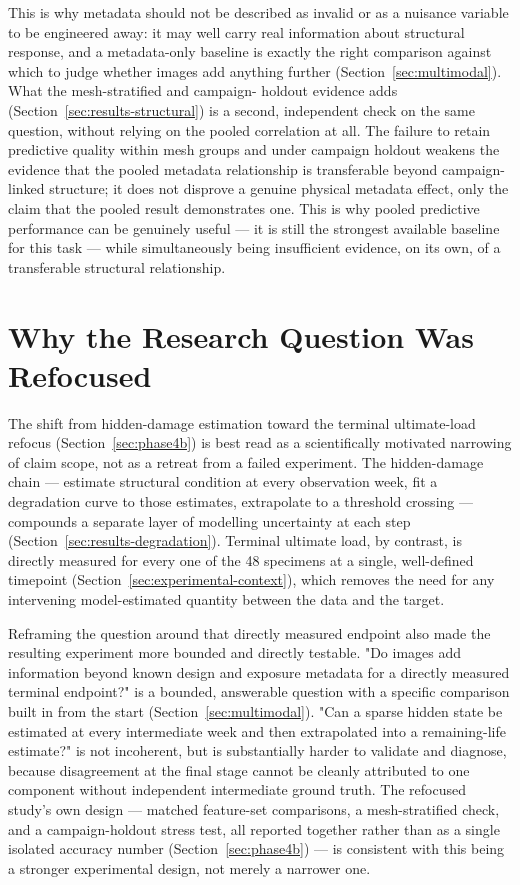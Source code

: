 This is why metadata should not be described as invalid or as a nuisance
variable to be engineered away: it may well carry real information about
structural response, and a metadata-only baseline is exactly the right
comparison against which to judge whether images add anything further
(Section~\ref{sec:multimodal}). What the mesh-stratified and campaign-
holdout evidence adds (Section~\ref{sec:results-structural}) is a second,
independent check on the same question, without relying on the pooled
correlation at all. The failure to retain predictive quality within mesh
groups and under campaign holdout weakens the evidence that the pooled
metadata relationship is transferable beyond campaign-linked structure; it
does not disprove a genuine physical metadata effect, only the claim that
the pooled result demonstrates one. This is why pooled predictive
performance can be genuinely useful — it is still the strongest available
baseline for this task — while simultaneously being insufficient evidence,
on its own, of a transferable structural relationship.

\section{Why the Research Question Was Refocused}
\label{sec:interp-refocus}

The shift from hidden-damage estimation toward the terminal ultimate-load
refocus (Section~\ref{sec:phase4b}) is best read as a scientifically
motivated narrowing of claim scope, not as a retreat from a failed
experiment. The hidden-damage chain — estimate structural condition at
every observation week, fit a degradation curve to those estimates,
extrapolate to a threshold crossing — compounds a separate layer of
modelling uncertainty at each step (Section~\ref{sec:results-degradation}).
Terminal ultimate load, by contrast, is directly measured for every one of
the 48 specimens at a single, well-defined timepoint
(Section~\ref{sec:experimental-context}), which removes the need for any
intervening model-estimated quantity between the data and the target.

Reframing the question around that directly measured endpoint also made
the resulting experiment more bounded and directly testable. "Do images
add information beyond known design and exposure metadata for a directly
measured terminal endpoint?" is a bounded, answerable question with a
specific comparison built in from the start (Section~\ref{sec:multimodal}).
"Can a sparse hidden state be estimated at every intermediate week and
then extrapolated into a remaining-life estimate?" is not incoherent, but
is substantially harder to validate and diagnose, because disagreement at
the final stage cannot be cleanly attributed to one component without
independent intermediate ground truth. The refocused study's own
design — matched feature-set comparisons, a mesh-stratified check, and a
campaign-holdout stress test, all reported together rather than as a
single isolated accuracy number (Section~\ref{sec:phase4b}) — is
consistent with this being a stronger experimental design, not merely a
narrower one.

